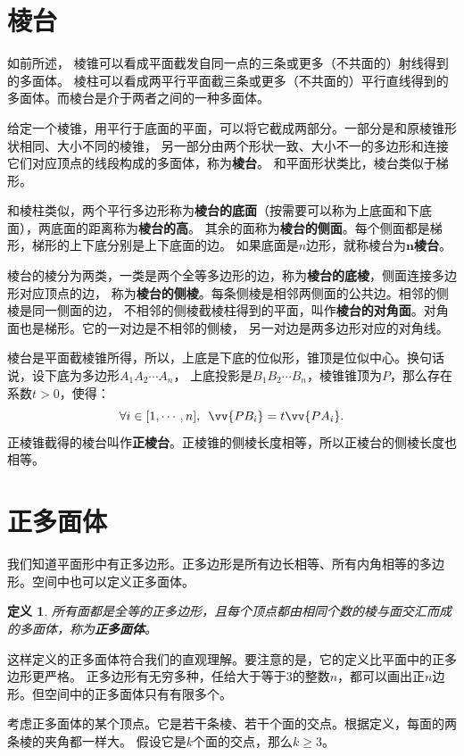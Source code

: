 \documentclass[12pt,UTF8]{ctexbook}
\newtheorem{df}{定义}[section]
\begin{document}
\section{棱台}
如前所述，
棱锥可以看成平面截发自同一点的三条或更多（不共面的）射线得到的多面体。
棱柱可以看成两平行平面截三条或更多（不共面的）平行直线得到的多面体。而棱台是介于两者之间的一种多面体。

给定一个棱锥，用平行于底面的平面，可以将它截成两部分。一部分是和原棱锥形状相同、大小不同的棱锥，
另一部分由两个形状一致、大小不一的多边形和连接它们对应顶点的线段构成的多面体，称为\textbf{棱台}。
和平面形状类比，棱台类似于梯形。

和棱柱类似，两个平行多边形称为\textbf{棱台的底面}（按需要可以称为上底面和下底面），两底面的距离称为\textbf{棱台的高}。
其余的面称为\textbf{棱台的侧面}。每个侧面都是梯形，梯形的上下底分别是上下底面的边。
如果底面是$n$边形，就称棱台为$\mathbf{n}$\textbf{棱台}。

棱台的棱分为两类，一类是两个全等多边形的边，称为\textbf{棱台的底棱}，侧面连接多边形对应顶点的边，
称为\textbf{棱台的侧棱}。每条侧棱是相邻两侧面的公共边。相邻的侧棱是同一侧面的边，
不相邻的侧棱截棱柱得到的平面，叫作\textbf{棱台的对角面}。对角面也是梯形。它的一对边是不相邻的侧棱，
另一对边是两多边形对应的对角线。

棱台是平面截棱锥所得，所以，上底是下底的位似形，锥顶是位似中心。换句话说，设下底为多边形$A_1A_2\cdots A_n$，
上底投影是$B_1B_2\cdots B_n$，棱锥锥顶为$P$，那么存在系数$t>0$，使得：
$$\forall i\in[1,\cdots ,n],\,\,\,\vv{PB_i} = t\vv{PA_i}.$$
正棱锥截得的棱台叫作\textbf{正棱台}。正棱锥的侧棱长度相等，所以正棱台的侧棱长度也相等。

\section{正多面体}
我们知道平面形中有正多边形。正多边形是所有边长相等、所有内角相等的多边形。空间中也可以定义正多面体。

\begin{df}
    所有面都是全等的正多边形，且每个顶点都由相同个数的棱与面交汇而成的多面体，称为\textbf{正多面体}。
\end{df}

这样定义的正多面体符合我们的直观理解。要注意的是，它的定义比平面中的正多边形更严格。
正多边形有无穷多种，任给大于等于$3$的整数$n$，都可以画出正$n$边形。但空间中的正多面体只有有限多个。

考虑正多面体的某个顶点。它是若干条棱、若干个面的交点。根据定义，每面的两条棱的夹角都一样大。
假设它是$k$个面的交点，那么$k \geqslant 3$。
\end{document}
